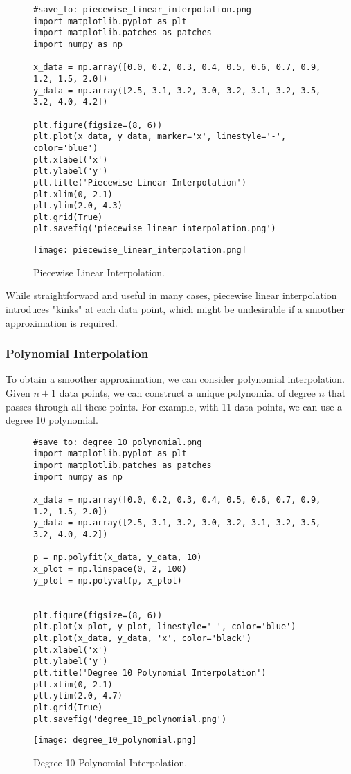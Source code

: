 \documentclass{article}
\begin{document}
\begin{figure}[h]
    \centering
    \begin{verbatim}
#save_to: piecewise_linear_interpolation.png
import matplotlib.pyplot as plt
import matplotlib.patches as patches
import numpy as np

x_data = np.array([0.0, 0.2, 0.3, 0.4, 0.5, 0.6, 0.7, 0.9, 1.2, 1.5, 2.0])
y_data = np.array([2.5, 3.1, 3.2, 3.0, 3.2, 3.1, 3.2, 3.5, 3.2, 4.0, 4.2])

plt.figure(figsize=(8, 6))
plt.plot(x_data, y_data, marker='x', linestyle='-', color='blue')
plt.xlabel('x')
plt.ylabel('y')
plt.title('Piecewise Linear Interpolation')
plt.xlim(0, 2.1)
plt.ylim(2.0, 4.3)
plt.grid(True)
plt.savefig('piecewise_linear_interpolation.png')
    \end{verbatim}
    \texttt{[image: piecewise\_linear\_interpolation.png]}
    \caption{Piecewise Linear Interpolation.}
    \label{fig:piecewise_linear_interpolation}
\end{figure}

While straightforward and useful in many cases, piecewise linear interpolation introduces "kinks" at each data point, which might be undesirable if a smoother approximation is required.

\subsubsection{Polynomial Interpolation}

To obtain a smoother approximation, we can consider polynomial interpolation. Given $n+1$ data points, we can construct a unique polynomial of degree $n$ that passes through all these points. For example, with 11 data points, we can use a degree 10 polynomial.

\begin{figure}[h]
    \centering
    \begin{verbatim}
#save_to: degree_10_polynomial.png
import matplotlib.pyplot as plt
import matplotlib.patches as patches
import numpy as np

x_data = np.array([0.0, 0.2, 0.3, 0.4, 0.5, 0.6, 0.7, 0.9, 1.2, 1.5, 2.0])
y_data = np.array([2.5, 3.1, 3.2, 3.0, 3.2, 3.1, 3.2, 3.5, 3.2, 4.0, 4.2])

p = np.polyfit(x_data, y_data, 10)
x_plot = np.linspace(0, 2, 100)
y_plot = np.polyval(p, x_plot)


plt.figure(figsize=(8, 6))
plt.plot(x_plot, y_plot, linestyle='-', color='blue')
plt.plot(x_data, y_data, 'x', color='black')
plt.xlabel('x')
plt.ylabel('y')
plt.title('Degree 10 Polynomial Interpolation')
plt.xlim(0, 2.1)
plt.ylim(2.0, 4.7)
plt.grid(True)
plt.savefig('degree_10_polynomial.png')
    \end{verbatim}
    \texttt{[image: degree\_10\_polynomial.png]}
    \caption{Degree 10 Polynomial Interpolation.}
    \label{fig:degree_10_polynomial}
\end{figure}
\end{document}
